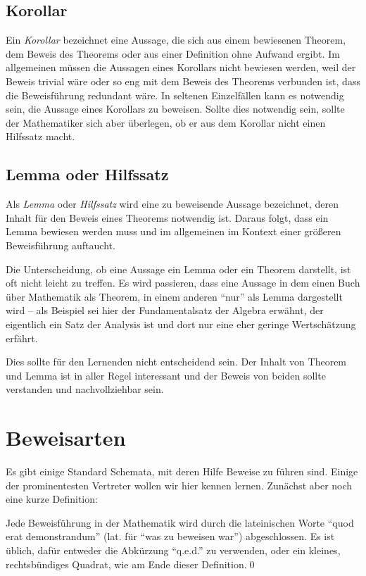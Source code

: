 \subsection{Korollar}

Ein \emph{Korollar} bezeichnet eine Aussage, die sich aus einem bewiesenen Theorem, dem Beweis des Theorems oder aus einer Definition ohne Aufwand ergibt. Im allgemeinen müssen die Aussagen eines Korollars nicht bewiesen werden, weil der Beweis trivial wäre oder so eng mit dem Beweis des Theorems verbunden ist, dass die Beweisführung redundant wäre. In seltenen Einzelfällen kann es notwendig sein, die Aussage eines Korollars zu beweisen. Sollte dies notwendig sein, sollte der Mathematiker sich aber überlegen, ob er aus dem Korollar nicht einen Hilfssatz macht.

\subsection{Lemma oder Hilfssatz}

Als \emph{Lemma} oder \emph{Hilfssatz} wird eine zu beweisende Aussage bezeichnet, deren Inhalt für den Beweis eines Theorems notwendig ist. Daraus folgt, dass ein Lemma bewiesen werden muss und im allgemeinen im Kontext einer größeren Beweisführung auftaucht. 

Die Unterscheidung, ob eine Aussage ein Lemma oder ein Theorem darstellt, ist oft nicht leicht zu treffen. Es wird passieren, dass eine Aussage in dem einen Buch über Mathematik als Theorem, in einem anderen "`nur"' als Lemma dargestellt wird -- als Beispiel sei hier der Fundamentalsatz der Algebra erwähnt, der eigentlich ein Satz der Analysis ist und dort nur eine eher geringe Wertschätzung erfährt. 

Dies sollte für den Lernenden nicht entscheidend sein. Der Inhalt von Theorem und Lemma ist in aller Regel interessant und der Beweis von beiden sollte verstanden und nachvollziehbar sein. 

\section{Beweisarten}

Es gibt einige Standard Schemata, mit deren Hilfe Beweise zu führen sind. Einige der prominentesten Vertreter wollen wir hier kennen lernen. Zunächst aber noch eine kurze Definition:
\begin{definition}
Jede Beweisführung in der Mathematik wird durch die lateinischen Worte "`quod erat demonstrandum"' (lat. für "`was zu beweisen war"') abgeschlossen. Es ist üblich, dafür entweder die Abkürzung "`q.e.d."' zu verwenden, oder ein kleines, rechtsbündiges Quadrat, wie am Ende dieser Definition.\qed
\end{definition}

